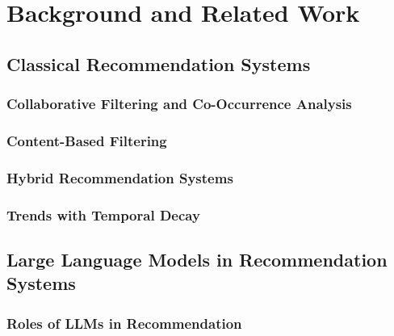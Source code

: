 \chapter{Background and Related Work}
\label{chap:background}

\section{Classical Recommendation Systems}
\label{sec:bg-recsys}

\subsection{Collaborative Filtering and Co-Occurrence Analysis}
\label{subsec:bg-collab}


\subsection{Content-Based Filtering}
\label{subsec:bg-content}


\subsection{Hybrid Recommendation Systems}
\label{subsec:bg-hybrid}


\subsection{Trends with Temporal Decay}
\label{subsec:bg-trending}


\section{Large Language Models in Recommendation Systems}
\label{sec:bg-llm-recsys}

\subsection{Roles of LLMs in Recommendation}
\label{subsec:bg-llm-roles}


